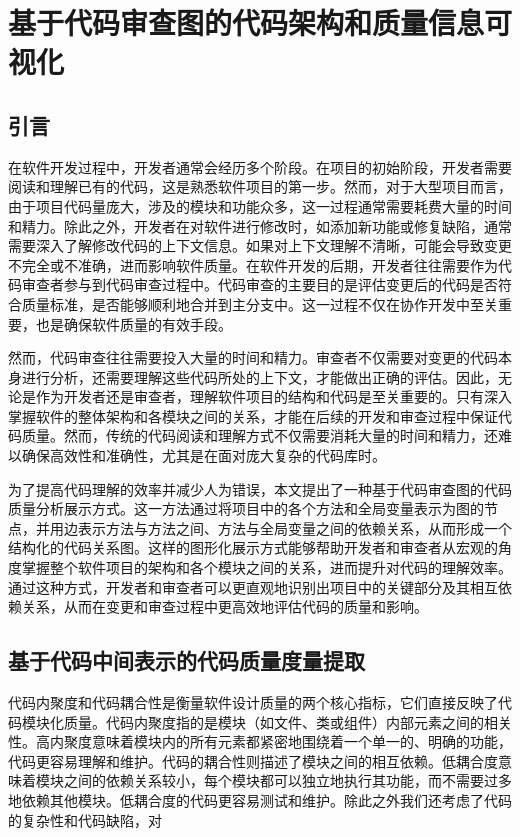 

\chapter{基于代码审查图的代码架构和质量信息可视化}
\section{引言}


在软件开发过程中，开发者通常会经历多个阶段。在项目的初始阶段，开发者需要阅读和理解已有的代码，这是熟悉软件项目的第一步。然而，对于大型项目而言，由于项目代码量庞大，涉及的模块和功能众多，这一过程通常需要耗费大量的时间和精力。除此之外，开发者在对软件进行修改时，如添加新功能或修复缺陷，通常需要深入了解修改代码的上下文信息。如果对上下文理解不清晰，可能会导致变更不完全或不准确，进而影响软件质量。在软件开发的后期，开发者往往需要作为代码审查者参与到代码审查过程中。代码审查的主要目的是评估变更后的代码是否符合质量标准，是否能够顺利地合并到主分支中。这一过程不仅在协作开发中至关重要，也是确保软件质量的有效手段。

然而，代码审查往往需要投入大量的时间和精力\cite{花子涵2024代码审查自动化研究综述}。审查者不仅需要对变更的代码本身进行分析，还需要理解这些代码所处的上下文，才能做出正确的评估。因此，无论是作为开发者还是审查者，理解软件项目的结构和代码是至关重要的。只有深入掌握软件的整体架构和各模块之间的关系，才能在后续的开发和审查过程中保证代码质量。然而，传统的代码阅读和理解方式不仅需要消耗大量的时间和精力，还难以确保高效性和准确性，尤其是在面对庞大复杂的代码库时。

为了提高代码理解的效率并减少人为错误，本文提出了一种基于代码审查图的代码质量分析展示方式。这一方法通过将项目中的各个方法和全局变量表示为图的节点，并用边表示方法与方法之间、方法与全局变量之间的依赖关系，从而形成一个结构化的代码关系图。这样的图形化展示方式能够帮助开发者和审查者从宏观的角度掌握整个软件项目的架构和各个模块之间的关系，进而提升对代码的理解效率。通过这种方式，开发者和审查者可以更直观地识别出项目中的关键部分及其相互依赖关系，从而在变更和审查过程中更高效地评估代码的质量和影响。


\section{基于代码中间表示的代码质量度量提取}

代码内聚度和代码耦合性是衡量软件设计质量的两个核心指标，它们直接反映了代
码模块化质量。代码内聚度指的是模块（如文件、类或组件）内部元素之间的相关性。高内聚度意味着模块内的所有元素都紧密地围绕着一个单一的、明确的功能，代码更容易理解和维护\cite{2014Service}。代码的耦合性则描述了模块之间的相互依赖。低耦合度意味着模块之间的依赖关系较小，每个模块都可以独立地执行其功能，而不需要过多地依赖其他模块。低耦合度的代码更容易测试和维护\cite{2013Ahe}。除此之外我们还考虑了代码的复杂性和代码缺陷，对


